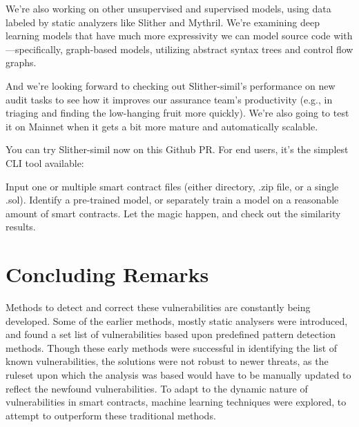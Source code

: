 We're also working on other unsupervised and supervised models, using data labeled by static analyzers like Slither and Mythril.
We're examining deep learning models that have much more expressivity we can model source code with—specifically, graph-based models, utilizing abstract syntax trees and control flow graphs.

And we're looking forward to checking out Slither-simil's performance on new audit tasks to see how it improves our assurance team's productivity (e.g., in triaging and finding the low-hanging fruit more quickly).
We're also going to test it on Mainnet when it gets a bit more mature and automatically scalable.

You can try Slither-simil now on this Github PR. For end users, it's the simplest CLI tool available:

Input one or multiple smart contract files (either directory, .zip file, or a single .sol).
Identify a pre-trained model, or separately train a model on a reasonable amount of smart contracts.
Let the magic happen, and check out the similarity results.

\section{Concluding Remarks}
Methods to detect and correct these vulnerabilities are constantly being developed.
Some of the earlier methods, mostly static analysers were introduced, and found a set list of vulnerabilities based upon predefined pattern detection methods.
Though these early methods were successful in identifying the list of known vulnerabilities, the solutions were not robust to newer threats, as the ruleset upon which the analysis was based would have to be manually updated to reflect the newfound vulnerabilities.
To adapt to the dynamic nature of vulnerabilities in smart contracts, machine learning techniques were explored, to attempt to outperform these traditional methods.


